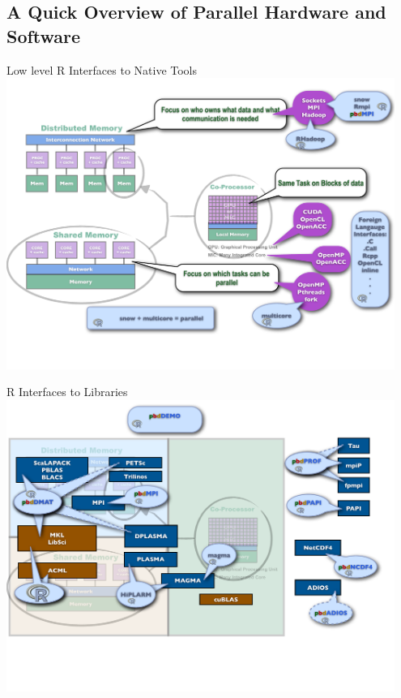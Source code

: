 \subsection{A Quick Overview of Parallel Hardware and Software}

\begin{frame}{Low level R Interfaces to Native Tools}
\includegraphics[width=0.95\textwidth]
{../common/pics/hardware/ParallelHardware10.pdf}
\end{frame}

\begin{frame}{R Interfaces to Libraries}
\includegraphics[width=0.95\textwidth]
{../common/pics/hardware/ParallelHardware14.pdf}
\end{frame}


